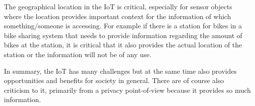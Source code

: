 The geographical location in the IoT is critical, especially for sensor objects where the location provides important context for the information of which something/someone is accessing\citep{misc:locationMatters}.
For example if there is a station for bikes in a bike sharing system that needs to provide information regarding the amount of bikes at the station, it is critical that it also provides the actual location of the station or the information will not be of any use.

In summary, the IoT has many challenges but at the same time also provides opportunities and benefits for society in general.
There are of course also criticism to it, primarily from a privacy point-of-view because it provides so much information.